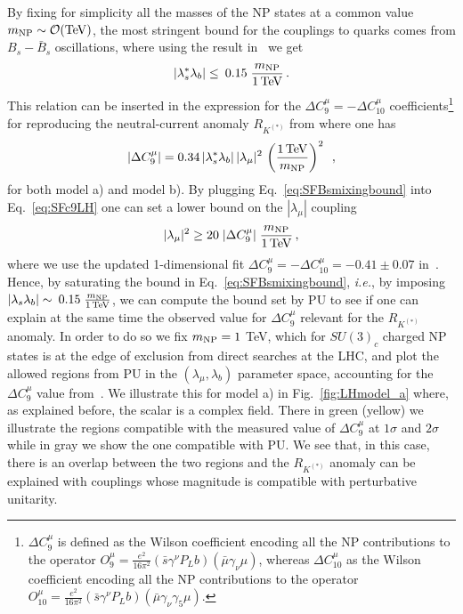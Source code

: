 \documentclass[a4paper,11pt]{article}
\newcommand{\be}{\begin{equation}}
\newcommand{\ee}{\end{equation}}
\begin{document}
By fixing for simplicity all the masses of the NP states at a common value $m_{{\rm NP}}\sim {\cal O}({\rm TeV})$,  the most stringent bound for the couplings to quarks comes from $B_s-\bar B_s$ oscillations, where using the result in~\cite{DiLuzio:2019jyq} we get
\begin{equation}
|\lambda_s^*\lambda_b |\le \:0.15\;\frac{m_{\rm NP}}{1\,{\rm TeV}}\,.
\label{eq:SFBsmixingbound}
\end{equation}
This relation can be inserted in the expression for the $\Delta C_9^\mu=-\Delta C_{10}^\mu$ coefficients\footnote{$\Delta C_9^\mu$ is defined as the Wilson coefficient encoding all the NP contributions to the operator $O_9^\mu=\frac{e^2}{16 \pi^2}(\bar{s} \gamma^\nu P_L b)(\bar \mu \gamma_\nu \mu)$, whereas $\Delta C_{10}^\mu$ as the Wilson coefficient encoding all the NP contributions to the operator $O_{10}^\mu=\frac{e^2}{16 \pi^2}(\bar{s}\gamma^\nu P_L b)(\bar \mu \gamma_\nu \gamma_5 \mu)$.  } for reproducing the neutral-current anomaly $R_{K^{(*)}}$ from where one has
\be
\label{eq:SFc9LH}
|\Delta C_9^\mu|=0.34\, |\lambda_s^*\lambda_b| \, |\lambda_\mu|^2 \,\left(\dfrac{1\, {\rm TeV}}{m_{\rm NP}}\right)^2 \, \ ,
\ee 
for both model a) and model b).   By plugging Eq.~\eqref{eq:SFBsmixingbound} into Eq.~\eqref{eq:SFc9LH} one can set a lower bound on the $ |\lambda_\mu|$ coupling~\cite{Arnan:2016cpy} 
\begin{equation}
 |\lambda_\mu|^2 \geq  20\; |\Delta C_9^\mu|\; \dfrac{m_{\rm NP}}{1\, {\rm TeV}} \,,
 \label{eq:c9boxbound}
\end{equation}
where we use the updated 1-dimensional fit $\Delta C_9^{\mu}=-\Delta C_{10}^\mu=-0.41\pm0.07$ in~\cite{Altmannshofer:2021qrr}. Hence, by saturating 
the bound in Eq.~\eqref{eq:SFBsmixingbound}, {\it i.e.}, by imposing $| \lambda_s \lambda_b |\sim \:0.15\;\frac{m_{\rm NP}}{1\,{\rm TeV}}$, we can compute the bound set by PU to see if one can explain at the same time the observed value for $\Delta C_9^\mu$ relevant for the $R_{K^{(*)}}$ anomaly. In order to do so we fix $m_{\rm NP}=1$ TeV, which for $SU(3)_c$ charged NP states is at the edge of exclusion from direct searches at the LHC, and plot the allowed regions from PU in the $(\lambda_\mu,\lambda_b)$ parameter space, accounting for the $\Delta C_9^\mu$ value from~\cite{Altmannshofer:2021qrr}.  We illustrate this for model a) in Fig.~\ref{fig:LHmodel_a} where, as explained before, the scalar is a complex field.
There in green (yellow) we illustrate the regions compatible with the measured value of $\Delta C_9^\mu$ at $1\sigma$ and $2\sigma$ while in gray we show the one compatible with PU.  We see that,  in this case, there is an overlap between the two regions and the $R_{K^{(*)}}$ anomaly can be explained with couplings whose magnitude is compatible with perturbative unitarity.
\end{document}
